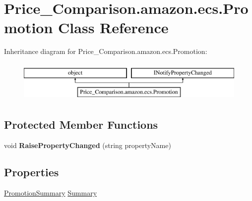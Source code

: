 \hypertarget{class_price___comparison_1_1amazon_1_1ecs_1_1_promotion}{\section{Price\-\_\-\-Comparison.\-amazon.\-ecs.\-Promotion Class Reference}
\label{class_price___comparison_1_1amazon_1_1ecs_1_1_promotion}
}


 


Inheritance diagram for Price\-\_\-\-Comparison.\-amazon.\-ecs.\-Promotion\-:\begin{figure}[H]
\begin{center}
\leavevmode
\includegraphics[height=2.000000cm]{class_price___comparison_1_1amazon_1_1ecs_1_1_promotion}
\end{center}
\end{figure}
\subsection*{Protected Member Functions}
\begin{DoxyCompactItemize}
\item 
\hypertarget{class_price___comparison_1_1amazon_1_1ecs_1_1_promotion_a37db52093d865405ba4a9e6e6f3b95ac}{void {\bfseries Raise\-Property\-Changed} (string property\-Name)}\label{class_price___comparison_1_1amazon_1_1ecs_1_1_promotion_a37db52093d865405ba4a9e6e6f3b95ac}

\end{DoxyCompactItemize}
\subsection*{Properties}
\begin{DoxyCompactItemize}
\item 
\hypertarget{class_price___comparison_1_1amazon_1_1ecs_1_1_promotion_a7e2c167227b80c4900e1928ebd88f159}{\hyperlink{class_price___comparison_1_1amazon_1_1ecs_1_1_promotion_summary}{Promotion\-Summary} \hyperlink{class_price___comparison_1_1amazon_1_1ecs_1_1_promotion_a7e2c167227b80c4900e1928ebd88f159}{Summary}}\label{class_price___comparison_1_1amazon_1_1ecs_1_1_promotion_a7e2c167227b80c4900e1928ebd88f159}

\begin{DoxyCompactList}\small\item\em \end{DoxyCompactList}\end{DoxyCompactItemize}
